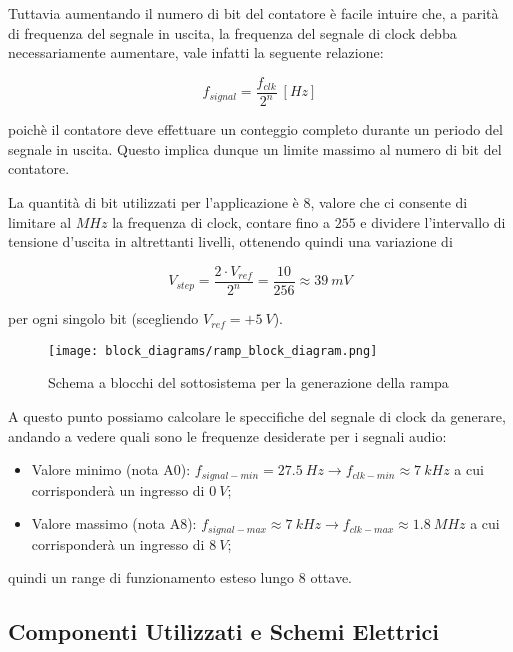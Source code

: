 Tuttavia aumentando il numero di bit del contatore è facile intuire che, a parità di
frequenza del segnale in uscita, la frequenza del segnale di clock debba necessariamente
aumentare, vale infatti la seguente relazione:

\begin{displaymath}
    f_{signal}=\frac{f_{clk}}{2^n}\ [Hz]
\end{displaymath}

poichè il contatore deve effettuare un conteggio completo durante un periodo del segnale
in uscita. Questo implica dunque un limite massimo al numero di bit del contatore.

La quantità di bit utilizzati per l'applicazione è $8$, valore che ci consente di limitare
al $MHz$ la frequenza di clock, contare fino a $255$ e dividere l'intervallo di tensione
d'uscita in altrettanti livelli, ottenendo quindi una variazione di

\begin{displaymath}
    V_{step}=\frac{2\cdot V_{ref}}{2^n}=\frac{10}{256}\approx39\ mV
\end{displaymath}


per ogni singolo bit (scegliendo $V_{ref}=+5\ V$).
\medskip

\begin{figure}[H]
    \centering
    \texttt{[image: block\_diagrams/ramp\_block\_diagram.png]}
    \caption{Schema a blocchi del sottosistema per la generazione della rampa}
    \label{ramp_block_diagram}
\end{figure}

A questo punto possiamo calcolare le speccifiche del segnale di clock da generare,
andando a vedere quali sono le frequenze desiderate per i segnali audio:

\begin{itemize}
    \item Valore minimo (nota A0): $f_{signal-min}=27.5\ Hz\rightarrow f_{clk-min}\approx7\ kHz$
          a cui corrisponderà un ingresso di $0\ V$;
    \item Valore massimo (nota A8): $f_{signal-max}\approx7\ kHz\rightarrow f_{clk-max}\approx1.8\ MHz$
          a cui corrisponderà un ingresso di $8\ V$;
\end{itemize}

quindi un range di funzionamento esteso lungo 8 ottave.


\subsection*{Componenti Utilizzati e Schemi Elettrici}

